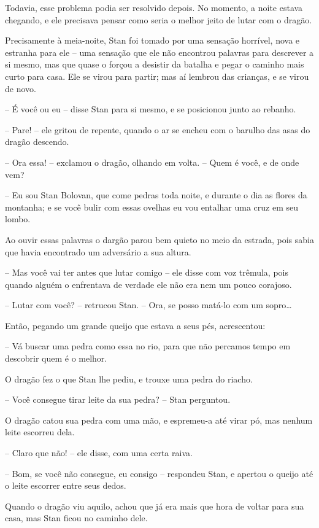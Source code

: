Todavia, esse problema podia ser resolvido depois. No momento, a noite
estava chegando, e ele precisava pensar como seria o melhor jeito de
lutar com o dragão.

Precisamente à meia-noite, Stan foi tomado por uma sensação horrível,
nova e estranha para ele -- uma sensação que ele não encontrou
palavras para descrever a si mesmo, mas que quase o forçou a desistir
da batalha e pegar o caminho mais curto para casa. Ele se virou para
partir; mas aí lembrou das crianças, e se virou de novo.

-- É você ou eu -- disse Stan para si mesmo, e se posicionou junto ao
rebanho.

-- Pare! -- ele gritou de repente, quando o ar se encheu com o barulho
das asas do dragão descendo.

-- Ora essa! -- exclamou o dragão, olhando em volta. -- Quem é você, e de
onde vem? 

-- Eu sou Stan Bolovan, que come pedras toda noite, e durante o dia as
flores da montanha; e se você bulir com essas ovelhas eu vou entalhar
uma cruz em seu lombo.

Ao ouvir essas palavras o dargão parou bem quieto no meio da estrada,
pois sabia que havia encontrado um adversário a sua altura.

-- Mas você vai ter antes que lutar comigo -- ele disse com voz trêmula,
pois quando alguém o enfrentava de verdade ele não era nem um pouco
corajoso.

-- Lutar com você? -- retrucou Stan. -- Ora, se posso matá-lo com um
sopro…

Então, pegando um grande queijo que estava a seus pés, acrescentou:

-- Vá buscar uma pedra como essa no rio, para que não percamos tempo em
descobrir quem é o melhor.

O dragão fez o que Stan lhe pediu, e trouxe uma pedra do riacho.

-- Você consegue tirar leite da sua pedra? -- Stan perguntou.

O dragão catou sua pedra com uma mão, e espremeu-a até virar pó, mas
nenhum leite escorreu dela.

-- Claro que não! -- ele disse, com uma certa raiva.

-- Bom, se você não consegue, eu consigo -- respondeu Stan, e apertou o
queijo até o leite escorrer entre seus dedos.

Quando o dragão viu aquilo, achou que já era mais que hora de voltar
para sua casa, mas Stan ficou no caminho dele.

